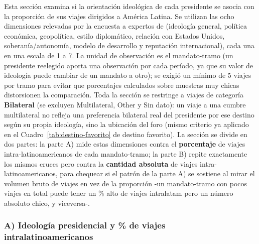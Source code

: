 \documentclass[11pt,a4paper]{article}
\begin{document}
Esta secci\'on examina si la orientaci\'on ideol\'ogica de cada presidente se asocia con la proporci\'on de sus viajes dirigidos a Am\'erica Latina. Se utilizan las ocho dimensiones relevadas por la encuesta a expertos de \citep{merkeForeignPolicyChange2020} (ideolog\'ia general, pol\'itica econ\'omica, geopol\'itica, estilo diplom\'atico, relaci\'on con Estados Unidos, soberan\'ia/autonom\'ia, modelo de desarrollo y reputaci\'on internacional), cada una en una escala de 1 a 7. La unidad de observaci\'on es el mandato-tramo (un presidente reelegido aporta una observaci\'on por cada per\'iodo, ya que su valor de ideolog\'ia puede cambiar de un mandato a otro); se exigi\'o un m\'inimo de 5 viajes por tramo para evitar que porcentajes calculados sobre muestras muy chicas distorsionen la comparaci\'on. Toda la secci\'on se restringe a viajes de categor\'ia \textbf{Bilateral} (se excluyen Multilateral, Other y Sin dato): un viaje a una cumbre multilateral no refleja una preferencia bilateral real del presidente por ese destino seg\'un su propia ideolog\'ia, sino la ubicaci\'on del foro (mismo criterio ya aplicado en el Cuadro~\ref{tab:destino-favorito} de destino favorito). La secci\'on se divide en dos partes: la parte A) mide estas dimensiones contra el \textbf{porcentaje} de viajes intra-latinoamericanos de cada mandato-tramo; la parte B) repite exactamente los mismos cruces pero contra la \textbf{cantidad absoluta} de viajes intra-latinoamericanos, para chequear si el patr\'on de la parte A) se sostiene al mirar el volumen bruto de viajes en vez de la proporci\'on -un mandato-tramo con pocos viajes en total puede tener un \% alto de viajes intralatam pero un n\'umero absoluto chico, y viceversa-.

\subsubsection*{A) Ideolog\'ia presidencial y \% de viajes intralatinoamericanos}
\end{document}
